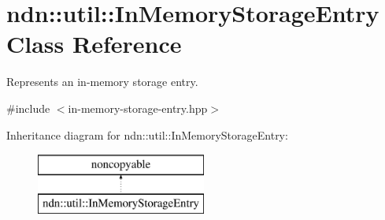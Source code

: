 \hypertarget{classndn_1_1util_1_1InMemoryStorageEntry}{}\section{ndn\+:\+:util\+:\+:In\+Memory\+Storage\+Entry Class Reference}
\label{classndn_1_1util_1_1InMemoryStorageEntry}


Represents an in-\/memory storage entry.  




{\ttfamily \#include $<$in-\/memory-\/storage-\/entry.\+hpp$>$}

Inheritance diagram for ndn\+:\+:util\+:\+:In\+Memory\+Storage\+Entry\+:\begin{figure}[H]
\begin{center}
\leavevmode
\includegraphics[height=2.000000cm]{classndn_1_1util_1_1InMemoryStorageEntry}
\end{center}
\end{figure}
